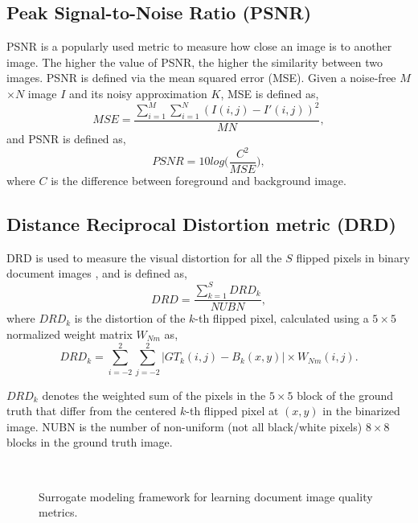 \documentclass[10pt, a4paper, conference, compsocconf]{IEEEtran}
\begin{document}
\subsection{Peak Signal-to-Noise Ratio (PSNR)}
PSNR is a popularly used metric to measure how close an image is to another image. The higher the value of PSNR, the higher the similarity between two images. PSNR is defined via the mean squared error (MSE). Given a noise-free $M$$\times$$N$ image $I$ and its noisy approximation $K$, MSE is defined as,
\begin{equation} 
MSE = \frac{\sum_{i=1}^{M}\sum_{i=1}^{N}(I(i,j) - I'(i,j))^2}{MN},
\label{eq_mse}
\end{equation}
and PSNR is defined as,
\begin{equation} 
PSNR = 10 log \Big( \frac{C^2}{MSE} \Big),
\label{eq_psnr}
\end{equation}
where $C$ is the difference between foreground and background image.

\subsection{Distance Reciprocal Distortion metric (DRD)}
DRD is used to measure the visual distortion for all the $S$ flipped pixels in binary document images \cite{lu2004distance}, and is defined as,
\begin{equation} 
DRD = \frac{\sum\limits_{k=1}^{S}DRD_k}{NUBN},
\label{eq_drd}
\end{equation}
where $DRD_k$ is the distortion of the $k$-th flipped pixel, calculated using a $5 \times 5$ normalized weight matrix $W_{Nm}$ as,
\begin{equation} 
DRD_k = {\sum\limits_{i=-2}^{2} \sum\limits_{j=-2}^{2} |GT_k(i,j) - B_k(x,y)| \times W_{Nm}(i,j)}.
\label{eq_drdk}
\end{equation}

$DRD_k$ denotes the weighted sum of the pixels in the $5 \times 5$ block of the ground truth that differ from the centered $k$-th flipped pixel at $(x,y)$ in the binarized image. NUBN is the number of non-uniform (not all black/white pixels) $8 \times 8$ blocks in the ground truth image. 

\begin{figure*}[!t]
  \centering
\\
\caption{Surrogate modeling framework for learning document image quality metrics.}
\label{fig_model}
\end{figure*}
\end{document}
